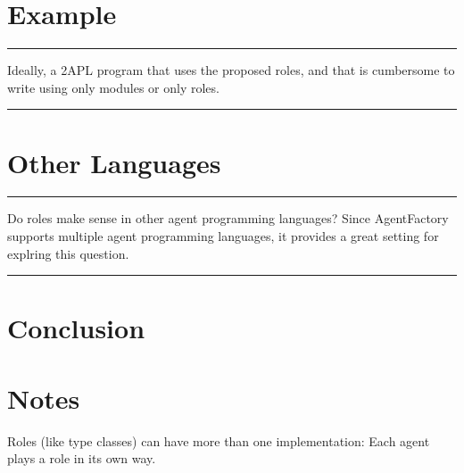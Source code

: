 \documentclass[conference,compsoc]{IEEEtran}
\newenvironment{notes}{\medskip\hrule\nobreak\smallskip\narrower}{\smallskip\hrule\medskip}
\begin{document}
\section{Example}

\begin{notes}
Ideally, a 2APL program that uses the proposed roles, and that is 
cumbersome to write using only modules or only roles.
\end{notes}

\section{Other Languages}

\begin{notes}
Do roles make sense in other agent programming languages? Since AgentFactory
supports multiple agent programming languages, it provides a great setting
for explring this question.
\end{notes}

\section{Conclusion}

\section*{Notes}

Roles (like type classes) can have more than one implementation: Each
agent plays a role in its own way.




\end{document}
